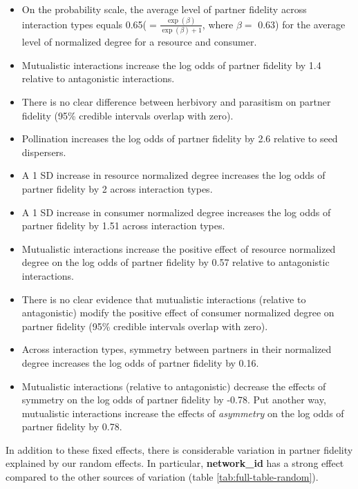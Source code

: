 \documentclass[11pt,]{article}
\begin{document}
\begin{itemize}
\item
  On the probability scale, the average level of partner fidelity across
  interaction types equals 0.65(\(=\frac{\exp(\beta)}{\exp(\beta)+1}\),
  where \(\beta=\) 0.63) for the average level of normalized degree for
  a resource and consumer.
\item
  Mutualistic interactions increase the log odds of partner fidelity by
  1.4 relative to antagonistic interactions.
\item
  There is no clear difference between herbivory and parasitism on
  partner fidelity (95\% credible intervals overlap with zero).
\item
  Pollination increases the log odds of partner fidelity by 2.6 relative
  to seed dispersers.
\item
  A 1 SD increase in resource normalized degree increases the log odds
  of partner fidelity by 2 across interaction types.
\item
  A 1 SD increase in consumer normalized degree increases the log odds
  of partner fidelity by 1.51 across interaction types.
\item
  Mutualistic interactions increase the positive effect of resource
  normalized degree on the log odds of partner fidelity by 0.57 relative
  to antagonistic interactions.
\item
  There is no clear evidence that mutualistic interactions (relative to
  antagonistic) modify the positive effect of consumer normalized degree
  on partner fidelity (95\% credible intervals overlap with zero).
\item
  Across interaction types, symmetry between partners in their
  normalized degree increases the log odds of partner fidelity by 0.16.
\item
  Mutualistic interactions (relative to antagonistic) decrease the
  effects of symmetry on the log odds of partner fidelity by -0.78. Put
  another way, mutualistic interactions increase the effects of
  \emph{asymmetry} on the log odds of partner fidelity by 0.78.
\end{itemize}

In addition to these fixed effects, there is considerable variation in
partner fidelity explained by our random effects. In particular,
\textbf{network\_id} has a strong effect compared to the other sources
of variation (table \ref{tab:full-table-random}).
\end{document}
